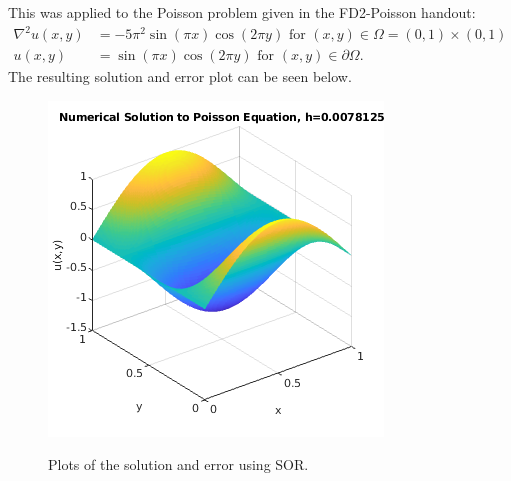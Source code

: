 \documentclass[12pt]{article}
\begin{document}
This was applied to the Poisson problem given in the FD2-Poisson handout:
\begin{align*}
	\nabla^2 u(x,y) &= -5 \pi^2 \sin(\pi x)\cos(2 \pi y) \text{ for } (x,y) \in \Omega = (0,1)\times(0,1)\\
	u(x,y) &= \sin(\pi x)\cos(2 \pi y) \text{ for } (x,y) \in \partial\Omega.
\end{align*}
The resulting solution and error plot can be seen below.
\begin{figure}[H]
	\centering
	\caption{Plots of the solution and error using SOR.}
	\begin{minipage}{.5\textwidth}
		\centering
		\includegraphics[width=1\linewidth]{hw4_p1_plot}
		\label{fig:test1}
	\end{minipage}%
	\begin{minipage}{.5\textwidth}
		\centering

\end{minipage}
\end{figure}
\end{document}
